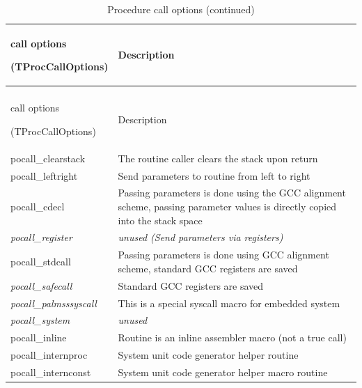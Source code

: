 \documentclass [a4paper,12pt]{article}
\begin{document}
\begin{longtable}{|l|p{10cm}|}
\caption{Procedure call options}\label{tproccalloptions}\\
\hline
call options \par (TProcCallOptions) & Description \\
\hline
\endfirsthead
\caption{Procedure call options (continued)}\\
\hline
call options \par (TProcCallOptions) & Description \\
\hline
\endhead
\hline
\endfoot
\textsf{pocall{\_}clearstack}&
    The routine caller clears the stack upon return \\
\textsf{pocall{\_}leftright}&
    Send parameters to routine from left to right \\
\textsf{pocall{\_}cdecl}&
    Passing parameters is done using the GCC alignment scheme, passing
    parameter values is directly copied into the stack space \\
\textsf{\textit{pocall{\_}register}}&
    \textit{unused (Send parameters via registers)} \\
\textsf{pocall{\_}stdcall}&
    Passing parameters is done using GCC alignment scheme, standard GCC registers
    are saved \\
\textsf{\textit{pocall{\_}safecall}}&
    Standard GCC registers are saved\\
\textsf{\textit{pocall{\_}palmsssyscall}}&
     This is a special syscall macro for embedded system \\
\textsf{\textit{pocall{\_}system}}&
    \textit{unused} \\
\textsf{pocall{\_}inline}&
    Routine is an inline assembler macro (not a true call) \\
\textsf{pocall{\_}internproc}&
    System unit code generator helper routine \\
\textsf{pocall{\_}internconst}&
    System unit code generator helper macro routine \\
\end{longtable}
\end{document}
